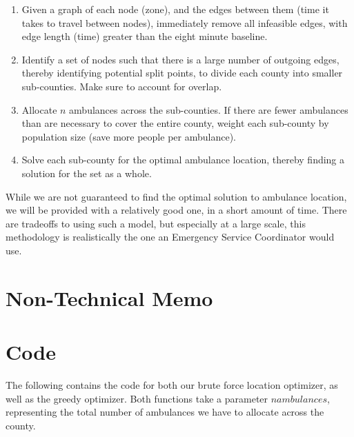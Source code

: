 \documentclass[notitlepage, 12pt]{article}
\begin{document}
\begin{enumerate}
\item Given a graph of each node (zone), and the edges between them (time it takes to travel between nodes),
    immediately remove all infeasible edges, with edge length (time) greater than the eight minute baseline.

\item Identify a set of nodes such that there is a large number of outgoing edges, thereby identifying potential
    split points, to divide each county into smaller sub-counties. Make sure to account for overlap.

\item Allocate $n$ ambulances across the sub-counties. If there are fewer ambulances than are necessary to cover
    the entire county, weight each sub-county by population size (save more people per ambulance).

\item Solve each sub-county for the optimal ambulance location, thereby finding a solution for the set as a whole.
\end{enumerate}

While we are not guaranteed to find the optimal solution to ambulance location, we will be provided with a relatively
good one, in a short amount of time. There are tradeoffs to using such a model, but especially at a large scale,
this methodology is realistically the one an Emergency Service Coordinator would use.

\section{Non-Technical Memo}

\newpage
\appendix
\section{Code}
The following contains the code for both our brute force location optimizer, as well as the greedy optimizer. Both functions take a parameter $nambulances$, representing the total number of ambulances we have to allocate across the county.







\end{document}
